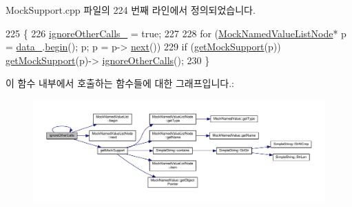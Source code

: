 Mock\+Support.\+cpp 파일의 224 번째 라인에서 정의되었습니다.


\begin{DoxyCode}
225 \{
226     \hyperlink{class_mock_support_a5a3b2bc086fdd2ca5aae69b37ea70942}{ignoreOtherCalls\_} = \textcolor{keyword}{true};
227 
228     \textcolor{keywordflow}{for} (\hyperlink{class_mock_named_value_list_node}{MockNamedValueListNode}* p = \hyperlink{class_mock_support_a26b06d2d43a7804c9aa5808409c0c1ee}{data\_}.\hyperlink{class_mock_named_value_list_a4a5976d05542385eb64ea73eee7fc59c}{begin}(); p; p = p->
      \hyperlink{class_mock_named_value_list_node_adaf0ca3232d35f7efae1bade86b8027e}{next}())
229         \textcolor{keywordflow}{if} (\hyperlink{class_mock_support_a575951d416e49f54fd1a3fc4823609e3}{getMockSupport}(p)) \hyperlink{class_mock_support_a575951d416e49f54fd1a3fc4823609e3}{getMockSupport}(p)->
      \hyperlink{class_mock_support_ae5bfa35a3e8a4328360a1b824bfa10c6}{ignoreOtherCalls}();
230 \}
\end{DoxyCode}


이 함수 내부에서 호출하는 함수들에 대한 그래프입니다.\+:
\nopagebreak
\begin{figure}[H]
\begin{center}
\leavevmode
\includegraphics[width=350pt]{class_mock_support_ae5bfa35a3e8a4328360a1b824bfa10c6_cgraph}
\end{center}
\end{figure}




